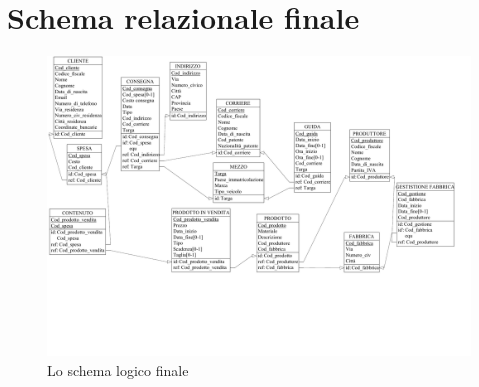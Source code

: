 \documentclass[a4paper,12pt]{report}
\begin{document}
\section{Schema relazionale finale}
\begin{figure}[H]
	\centering{}
	\includegraphics[width=\textwidth]{img/SchemaLogico-fin.pdf}
	\caption{Lo schema logico finale}
\end{figure}
\end{document}
